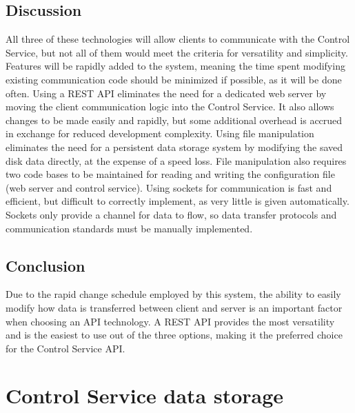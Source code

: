 		\subsection{Discussion}
		All three of these technologies will allow clients to communicate with the Control Service, but not all of them would meet the criteria for versatility and simplicity.
		Features will be rapidly added to the system, meaning the time spent modifying existing communication code should be minimized if possible, as it will be done often.
		Using a REST API eliminates the need for a dedicated web server by moving the client communication logic into the Control Service. It also allows changes to be made easily and rapidly, but some additional overhead is accrued in exchange for reduced development complexity.
		Using file manipulation eliminates the need for a persistent data storage system by modifying the saved disk data directly, at the expense of a speed loss.
		File manipulation also requires two code bases to be maintained for reading and writing the configuration file (web server and control service).
		Using sockets for communication is fast and efficient, but difficult to correctly implement, as very little is given automatically.
		Sockets only provide a channel for data to flow, so data transfer protocols and communication standards must be manually implemented.

		\subsection{Conclusion}
		Due to the rapid change schedule employed by this system, the ability to easily modify how data is transferred between client and server is an important factor when choosing an API technology.
		A REST API provides the most versatility and is the easiest to use out of the three options, making it the preferred choice for the Control Service API.


	\section{Control Service data storage}
